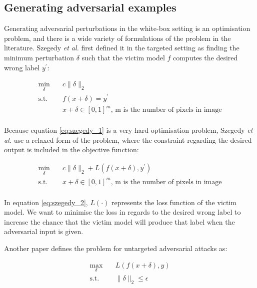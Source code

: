 \subsection{Generating adversarial examples}

Generating adversarial perturbations in the white-box setting is an optimisation problem, and there is a wide variety of formulations of the problem in the literature. Szegedy \textit{et al.} \cite{szegedy2014intriguing} first defined it in the targeted setting as finding the minimum perturbation $\delta$ such that the victim model $f$ computes the desired wrong label $y^\prime$:

\begin{equation}
\label{eq:szegedy_1}
\begin{aligned}
\min_{\delta} \quad & c\|\delta\|_2\\
\textrm{s.t.} \quad & f(x + \delta) = y^\prime\\
  &x + \delta \in [0,1]^m \textrm{, m is the number of pixels in image}   \\
\end{aligned}
\end{equation}

Because equation \ref{eq:szegedy_1} is a very hard optimisation problem, Szegedy \textit{et al.} \cite{szegedy2014intriguing} use a relaxed form of the problem, where the constraint regarding the desired output is included in the objective function:

\begin{equation}
\label{eq:szegedy_2}
\begin{aligned}
\min_{\delta} \quad & c\|\delta\|_2 + L(f(x + \delta), y^\prime)\\
\textrm{s.t.} \quad& x + \delta \in [0,1]^m \textrm{, m is the number of pixels in image}   \\
\end{aligned}
\end{equation}

In equation \ref{eq:szegedy_2}, $L(\cdot)$ represents the loss function of the victim model. We want to minimise the loss in regards to the desired wrong label to increase the chance that the victim model will produce that label when the adversarial input is given.

Another paper \cite{silva_survey} defines the problem for untargeted adversarial attacks as:

\begin{equation}
\begin{aligned}
\max_{\delta} \quad & L(f(x + \delta), y)\\
\textrm{s.t.} \quad& \|\delta\|_2\leq\epsilon   \\
\end{aligned}
\end{equation}

